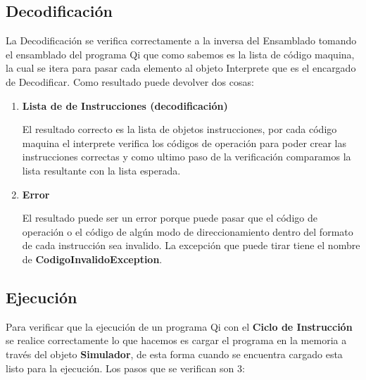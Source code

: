 \subsection{Decodificación}

La Decodificación se verifica correctamente a la inversa del Ensamblado tomando el ensamblado del programa Qi que como sabemos es la lista de código maquina, la cual se itera para pasar cada elemento al objeto Interprete que es el encargado de Decodificar. Como resultado puede devolver dos cosas: 
\begin{enumerate}
\item \textbf{Lista de de Instrucciones (decodificación)} 

El resultado correcto es la lista de objetos instrucciones, por cada código maquina el interprete verifica los códigos de operación para poder crear las instrucciones correctas y como ultimo paso de la verificación comparamos la lista resultante con la lista esperada.
\item\textbf{Error}

El resultado puede ser un error porque puede pasar que el código de operación o el código de algún modo de direccionamiento dentro del formato de cada instrucción sea invalido. La excepción que puede tirar tiene el nombre de \textbf{CodigoInvalidoException}.   
\end{enumerate}

\subsection{Ejecución}

Para verificar que la ejecución de un programa Qi con el \textbf{Ciclo de Instrucción} se realice correctamente lo que hacemos es cargar el programa en la memoria a través del objeto \textbf{Simulador}, de esta forma cuando se encuentra cargado esta listo para la ejecución. Los pasos que se verifican son 3:

